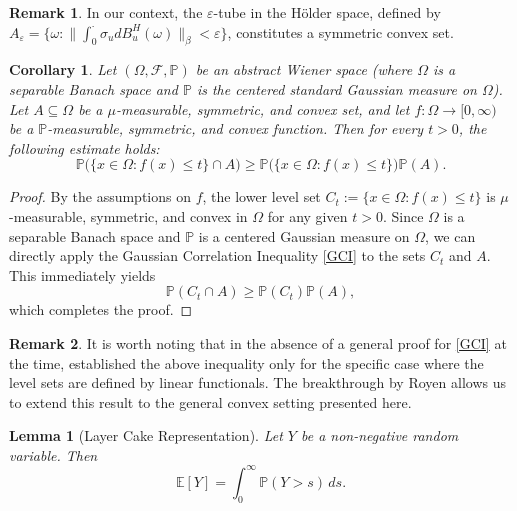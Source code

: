 \documentclass[preprint,12pt]{elsarticle}
\newtheorem{lemma}[theorem]{Lemma}
\newtheorem{corollary}[theorem]{Corollary}
\theoremstyle{definition}
\newtheorem{remark}{Remark}[section]
\theoremstyle{plain}
\begin{document}
\begin{remark}
In our context, the $\varepsilon$-tube in the H\"{o}lder space, defined by $A_\varepsilon = \{ \omega : \|\int_0^\cdot \sigma_u dB^H_u(\omega)\|_\beta < \varepsilon \}$, constitutes a symmetric convex set. 
\end{remark}

\begin{corollary} \label{gauss set}
Let $(\Omega, \mathcal{F}, \mathbb{P})$ be an abstract Wiener space (where $\Omega$ is a separable Banach space and $\mathbb{P}$ is the centered standard Gaussian measure on $\Omega$). 
Let $A \subseteq \Omega$ be a $\mu$-measurable, symmetric, and convex set, and let $f: \Omega \to [0, \infty)$ be a $\mathbb{P}$-measurable, symmetric, and convex function. Then for every $t > 0$, the following estimate holds:
\begin{equation*}
    \mathbb{P}\bigl(\{x \in \Omega : f(x) \le t\} \cap A\bigr)
    \ge
    \mathbb{P}\bigl(\{x \in \Omega: f(x) \le t\}\bigr) \mathbb{P}(A).
\end{equation*}
\end{corollary}

\begin{proof}
By the assumptions on $f$, the lower level set $C_t := \{x \in \Omega : f(x) \le t\}$ is $\mu$-measurable, symmetric, and convex in $\Omega$ for any given $t > 0$. Since $\Omega$ is a separable Banach space and $\mathbb{P}$ is a centered Gaussian measure on $\Omega$, we can directly apply the Gaussian Correlation Inequality \eqref{GCI} to the sets $C_t$ and $A$. This immediately yields
\begin{equation*}
    \mathbb{P}(C_t \cap A) \ge \mathbb{P}(C_t) \mathbb{P}(A),
    \end{equation*}
which completes the proof.
\end{proof}


\begin{remark}
It is worth noting that in the absence of a general proof for \eqref{GCI} at the time, \cite[Corollary 4.6.3]{Bogachev1998} established the above inequality only for the specific case where the level sets are defined by linear functionals. The breakthrough by Royen \cite{royen2014convex} allows us to extend this result to the general convex setting presented here.
\end{remark}

\begin{lemma}[Layer Cake Representation]\label{tail}
Let $Y$ be a non-negative random variable. Then
\begin{equation*}
    \mathbb{E}[Y] = \int_0^\infty \mathbb{P}(Y > s) \, ds.
\end{equation*}
\end{lemma}
\end{document}
